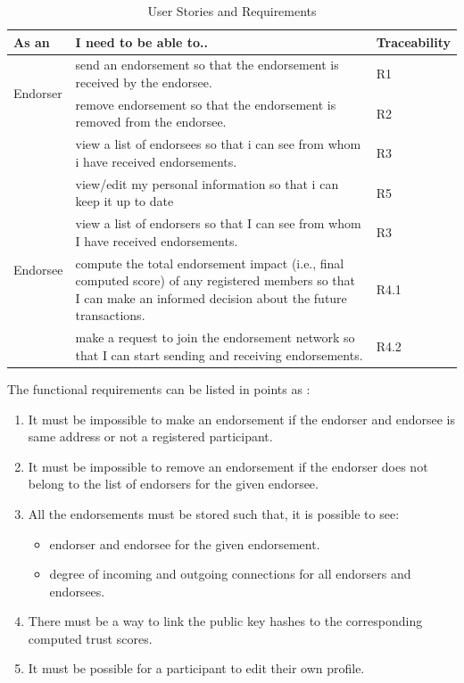 \begin{center} \label{table:userstories} 
	\begin{table}
	\begin{tabular} {| l | p{8cm} | l |}
		\hline
		\textbf{As an}  & \textbf{I need to be able to..}   & \textbf{Traceability} \\
		\hline
		\multirow{2}{*}{Endorser} & send an endorsement so that the endorsement
		is received by the endorsee.& R1
		\\\cline{2-3} 
		& remove endorsement so that the endorsement is removed from the
		endorsee.  & R2 \\\cline{2-3}
		& view a list of endorsees so that i can see from whom i have received 
		endorsements.& R3 \\\cline{2-3}
		& view/edit my personal information so that i can keep it up to
		date& R5 \\\cline{2-3}
		\hline
		\multirow{2}{*}{Endorsee} & view a list of endorsers so that I can see
		from whom I have received endorsements.& R3 \\\cline{2-3}
		\hline
		\multirow{2}{*}{other users} & compute the total endorsement
		impact (i.e., final computed score) of any registered members so that I
		can make an informed decision about the future transactions.
		& R4.1 \\\cline{2-3}
		& make a request to join the endorsement network so that I can start
		sending and receiving endorsements.  
		& R4.2 \\\cline{2-3}
		\hline
	\end{tabular}
	\caption{User Stories and Requirements}
\end{table}
\end{center}
The functional requirements can be listed in points as : 
\begin{enumerate}
	\item It must be impossible to make an endorsement if the endorser and
		endorsee is same address or not a registered participant.
	\item It must be impossible to remove an endorsement if the endorser
		does not belong to the list of endorsers for the given endorsee.
	\item All the endorsements must be stored such that, it is possible to see: 
		\begin{itemize}
			\item endorser and endorsee for the given endorsement.
			\item degree of incoming and outgoing connections for all endorsers and endorsees.
		\end{itemize}
	\item There must be a way to link the public key hashes to the
		corresponding computed trust scores. 
	\item It must be possible for a participant to edit their own profile. 
\end{enumerate}

